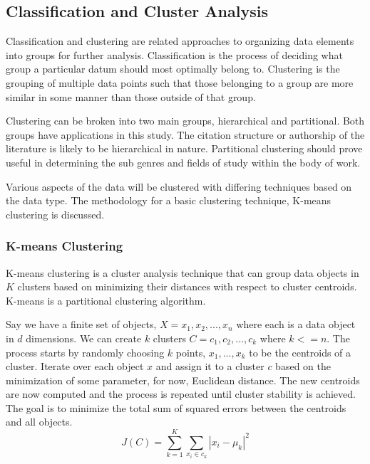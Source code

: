 \documentclass[12pt]{article}
\begin{document}
\begin{doublespacing}

\subsection{Classification and Cluster Analysis}
Classification and clustering are related approaches to organizing data elements into groups for further analysis.
Classification is the process of deciding what group a particular datum should most optimally belong to.
Clustering is the grouping of multiple data points such that those belonging to a group are more similar in some manner than those outside of that group.

Clustering can be broken into two main groups, hierarchical and partitional.
Both groups have applications in this study.
The citation structure or authorship of the literature is likely to be hierarchical in nature.
Partitional clustering should prove useful in determining the sub genres and fields of study within the body of work.

Various aspects of the data will be clustered with differing techniques based on the data type.
The methodology for a basic clustering technique, K-means clustering is discussed.

\subsubsection{K-means Clustering}
K-means clustering is a cluster analysis technique that can group data objects in $K$ clusters based on minimizing their distances with respect to cluster centroids.
K-means is a partitional clustering algorithm.

Say we have a finite set of objects,  $X = {x_1, x_2, ..., x_n}$ where each is a data object in $d$ dimensions.
We can create $k$ clusters $C = {c_1, c_2, ..., c_k}$ where $k <= n$.
The process starts by randomly choosing $k$ points, ${x_1, ..., x_k}$ to be the centroids of a cluster.
Iterate over each object $x$ and assign it to a cluster $c$ based on the minimization of some parameter, for now, Euclidean distance.
The new centroids are now computed and the process is repeated until cluster stability is achieved.
The goal is to minimize the total sum of squared errors between the centroids and all objects. 
\begin{equation} \label{kmeans}
J(C) = \sum^K_{k=1} \sum_{x_i \in c_k} \left| x_i - \mu_k \right| ^2
\end{equation}


\end{doublespacing}
\end{document}
